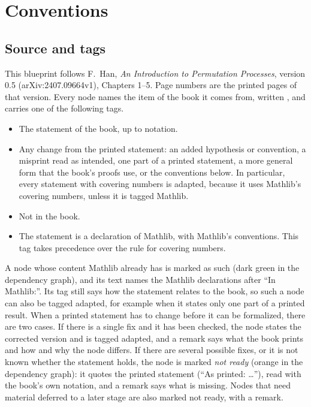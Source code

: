 \chapter{Conventions}
\label{chap:conventions}

\section{Source and tags}

This blueprint follows F.~Han, \emph{An Introduction to Permutation Processes}, version 0.5 (arXiv:2407.09664v1), Chapters 1--5. Page numbers are the printed pages of that version. Every node names the item of the book it comes from, written , and carries one of the following tags.
\begin{itemize}
  \item {} The statement of the book, up to notation.
  \item {} Any change from the printed statement: an added hypothesis or convention, a misprint read as intended, one part of a printed statement, a more general form that the book's proofs use, or the conventions below. In particular, every statement with covering numbers is adapted, because it uses Mathlib's covering numbers, unless it is tagged Mathlib.
  \item {} Not in the book.
  \item {} The statement is a declaration of Mathlib, with Mathlib's conventions. This tag takes precedence over the rule for covering numbers.
\end{itemize}
A node whose content Mathlib already has is marked as such (dark green in the dependency graph), and its text names the Mathlib declarations after ``In Mathlib:''. Its tag still says how the statement relates to the book, so such a node can also be tagged adapted, for example when it states only one part of a printed result.
When a printed statement has to change before it can be formalized, there are two cases. If there is a single fix and it has been checked, the node states the corrected version and is tagged adapted, and a remark says what the book prints and how and why the node differs. If there are several possible fixes, or it is not known whether the statement holds, the node is marked \emph{not ready} (orange in the dependency graph): it quotes the printed statement (``As printed: \ldots''), read with the book's own notation, and a remark says what is missing. Nodes that need material deferred to a later stage are also marked not ready, with a remark.

